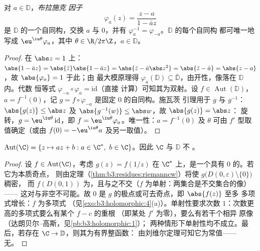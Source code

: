 \begin{theorem}[圆盘的自同构]
\label{thm:b3:conformal:autdisc}
对 $a \in \mathbb D$，\emph{布拉施克
因子}
\[
\varphi_a(z) = \frac{z - a}{1 - \bar a z}
\]
是 $\mathbb D$ 的一个自同构，交换 $a$ 与 $0$，并有
$\varphi_a^{-1} = \varphi_{-a}$。$\mathbb D$ 的每个自同构
都可唯一地写成 $\eu^{\iu\theta}\varphi_a$，其中 $\theta
\in \R/2\pi\Z$，$a \in \mathbb D$。
\end{theorem}

\begin{proof}
在 $\abs z = 1$ 上：$\abs{1 - \bar az} = \abs{\bar z}\abs{1 -
\bar az} = \abs{\bar z - \bar a\abs z^2} = \abs{\bar z - \bar
a} = \abs{z - a}$，故 $\abs{\varphi_a} = 1$ 于此；由
最大模原理得 $\varphi_a(\mathbb D) \subseteq \bar{\mathbb
D}$，由开性，像落在 $\mathbb D$ 内。代数
恒等式 $\varphi_{-a}\circ\varphi_a = \mathrm{id}$（直接
计算）可知其为双射。设 $f \in
\operatorname{Aut}(\mathbb D)$，$a = f^{-1}(0)$，记 $g =
f\circ\varphi_{-a}$ 是固定 $0$ 的自同构。施瓦茨
引理用于 $g$ 与 $g^{-1}$：$\abs{g(z)} \leq \abs z$ 及
$\abs{g^{-1}(w)} \leq \abs w$，故 $\abs{g(z)} = \abs z$：
旋转，$g = \eu^{\iu\theta}\,\mathrm{id}$，即 $f =
\eu^{\iu\theta}\varphi_a$。唯一性：$a = f^{-1}(0)$ 及
$\theta$ 可由 $f'$ 型取值确定（或由 $f(0) =
-\eu^{\iu\theta}a$ 及另一取值）。
\end{proof}

\begin{theorem}[平面的自同构]
\label{thm:b3:conformal:autplane}
$\operatorname{Aut}(\C) = \{z \mapsto az + b : a \in \C^*,\ b
\in \C\}$。因此 $\C$ 与 $\mathbb D$ 不
。
\end{theorem}

\begin{proof}
设 $f \in \operatorname{Aut}(\C)$，考虑 $g(z) =
f(1/z)$ 在 $\C^*$ 上，是一个具有 $0$ 的。若它为本质奇点，
则由定理（\cref{thm:b3:residues:riemanncw}）将使
$g\bigl(D(0,\varepsilon)\setminus\{0\}\bigr)$ 稠密，
而 $f(D(0, 1))$ 为，且与之不交（$f$
为单射：两集合是不交集合的像）——
这对与非空不可能。故 $0$ 是
$g$ 的极点或可去奇点，即 $\abs{f(z)}$ 至多
多项式增长：$f$ 为多项式
（见\cref{exo:b3:holomorphic:4}(a)）。单射性要求次数
$1$：次数更高的多项式要么有某个 $f - c$ 的重根
（即某处 $f'$ 为零），要么有若干个相异
原像（达朗贝尔–高斯，见\cref{pb:b3:holomorphic:1}）；
两种情形下单射性均不成立。最后，若存在 $\C \to
\mathbb D$，则其为有界整函数：
由刘维尔定理可知它为常值——无。
\end{proof}

